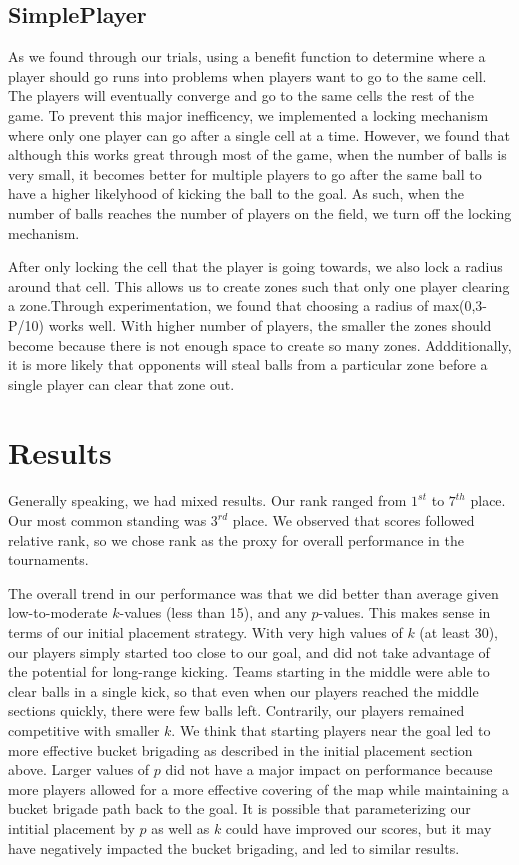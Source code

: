 \documentclass[
10pt, %
letterpaper, %
oneside, %
headinclude,footinclude, %
english
]{article}
\begin{document}
\subsection{SimplePlayer}
As we found through our trials, using a benefit function to determine where a player should go runs into problems when players want to go to the same cell. The players will eventually converge and go to the same cells the rest of the game. To prevent this major inefficency, we implemented a locking mechanism where only one player can go after a single cell at a time. However, we found that although this works great through most of the game, when the number of balls is very small, it becomes better for multiple players to go after the same ball to have a higher likelyhood of kicking the ball to the goal. As such, when the number of balls reaches the number of players on the field, we turn off the locking mechanism.

After only locking the cell that the player is going towards, we also lock a radius around that cell. This allows us to create zones such that only one player clearing a zone.Through experimentation, we found that choosing a radius of max(0,3-P/10) works well. With higher number of players, the smaller the zones should become because there is not enough space to create so many zones. Addditionally, it is more likely that opponents will steal balls from a particular zone before a single player can clear that zone out.

\section{Results}
Generally speaking, we had mixed results. Our rank ranged from $1^{st}$ to $7^{th}$ place. Our most common standing was $3^{rd}$ place. We observed that scores followed relative rank, so we chose rank as the proxy for overall performance in the tournaments.

The overall trend in our performance was that we did better than average given low-to-moderate $k$-values (less than 15), and any $p$-values. This makes sense in terms of our initial placement strategy. With very high values of $k$ (at least 30), our players simply started too close to our goal, and did not take advantage of the potential for long-range kicking. Teams starting in the middle were able to clear balls in a single kick, so that even when our players reached the middle sections quickly, there were few balls left. Contrarily, our players remained competitive with smaller $k$. We think that starting players near the goal led to more effective bucket brigading as described in the initial placement section above. Larger values of $p$ did not have a major impact on performance because more players allowed for a more effective covering of the map while maintaining a bucket brigade path back to the goal. It is possible that parameterizing our intitial placement by $p$ as well as $k$ could have improved our scores, but it may have negatively impacted the bucket brigading, and led to similar results.
\end{document}
